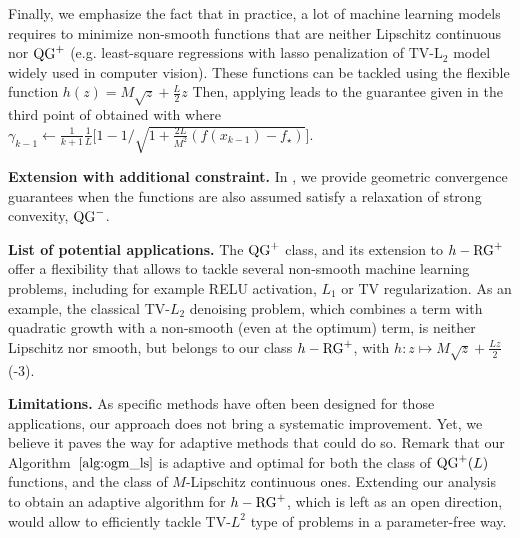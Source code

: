         Finally, we emphasize the fact that in practice, a lot of machine learning models requires to minimize non-smooth functions that are neither Lipschitz continuous nor $\operatorname{QG}^+$ (e.g. least-square regressions with lasso penalization of $\text{TV-L}_2$ model widely used in computer vision).
        These functions can be tackled using the flexible function $h(z) = M\sqrt{z} + \frac{L}{2}z$
        Then, applying  leads to the guarantee given in the third point of  obtained with  where $\gamma_{k-1} \gets \frac{1}{k+1}\frac{1}{L} \Big[ 1 - 1/\sqrt{1 + \frac{2L}{M^2}(f(x_{k-1}) - f_\star)} \Big]$.
    
        \textbf{Extension with additional constraint.} In , we provide geometric convergence guarantees when the functions are also assumed satisfy a relaxation of strong convexity, $\operatorname{QG}^-$.

        \textbf{List of potential applications.}
        The $\operatorname{QG}^+$ class, and its extension to $h-\operatorname{RG}^+$ offer a flexibility that allows to tackle several non-smooth machine learning problems, including for example RELU activation, $L_1$ or TV regularization.
        As an example, the classical TV-$L_2$ denoising problem, which combines a term with quadratic growth with a non-smooth (even at the optimum) term, is neither Lipschitz nor smooth, but belongs to our class $h-\operatorname{RG}^+$, with $h: z \mapsto M \sqrt{z}+\frac{L z}{2}$ (-3).

        \textbf{Limitations.}
        As specific methods have often been designed for those applications, our approach does not bring a systematic improvement.
        Yet, we believe it paves the way for adaptive methods that could do so.
        Remark that our Algorithm~$\ref{alg:ogm_ls}$ is adaptive and optimal for both the class of $\operatorname{QG}^+(L)$ functions, and the class of $M$-Lipschitz continuous ones.
        Extending our analysis to obtain an adaptive algorithm for $h-\operatorname{RG}^+$, which is left as an open direction, would allow to efficiently tackle TV-$L^2$ type of problems in a parameter-free way.

